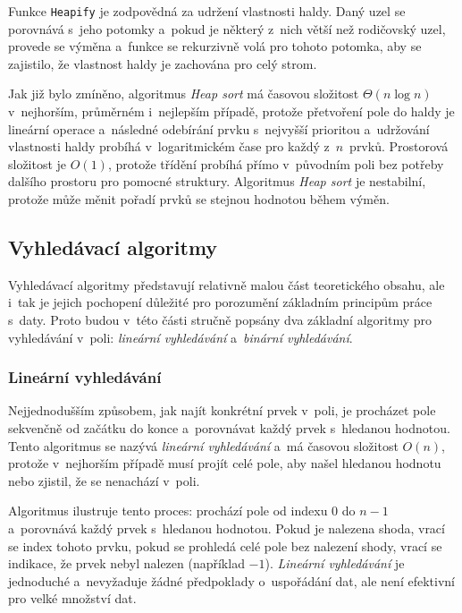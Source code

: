 Funkce \texttt{Heapify} je zodpovědná za udržení vlastnosti haldy.
Daný uzel se porovnává s~jeho potomky a~pokud je některý z~nich větší než rodičovský uzel, provede se výměna a~funkce se rekurzivně volá pro tohoto potomka, aby se zajistilo, že vlastnost haldy je zachována pro celý strom.

Jak již bylo zmíněno, algoritmus \textit{Heap sort} má časovou složitost $\Theta(n \log n)$ v~nejhorším, průměrném i~nejlepším případě, protože přetvoření pole do haldy je lineární operace a~následné odebírání prvku s~nejvyšší prioritou a~udržování vlastnosti haldy probíhá v~logaritmickém čase pro každý z~$n$~prvků.
Prostorová složitost je $O(1)$, protože třídění probíhá přímo v~původním poli bez potřeby dalšího prostoru pro pomocné struktury.
Algoritmus \textit{Heap sort} je nestabilní, protože může měnit pořadí prvků se stejnou hodnotou během výměn.~\cite{levitin}

\subsection{Vyhledávací algoritmy}
\label{subsec:searching_algorithms}

Vyhledávací algoritmy představují relativně malou část teoretického obsahu, ale i~tak je jejich pochopení důležité pro porozumění základním principům práce s~daty.
Proto budou v~této části stručně popsány dva základní algoritmy pro vyhledávání v~poli: \textit{lineární vyhledávání} a~\textit{binární vyhledávání}.

\subsubsection*{Lineární vyhledávání}

Nejjednodušším způsobem, jak najít konkrétní prvek v~poli, je procházet pole sekvenčně od začátku do konce a~porovnávat každý prvek s~hledanou hodnotou.
Tento algoritmus se nazývá \textit{lineární vyhledávání} a~má časovou složitost $O(n)$, protože v~nejhorším případě musí projít celé pole, aby našel hledanou hodnotu nebo zjistil, že se nenachází v~poli.

\begin{listing}[ht]
    
    \caption{Pseudokód lineárního vyhledávání}
    \label{lst:linearSearch}
\end{listing}

Algoritmus  ilustruje tento proces: prochází pole od indexu 0 do $n-1$ a~porovnává každý prvek s~hledanou hodnotou.
Pokud je nalezena shoda, vrací se index tohoto prvku, pokud se prohledá celé pole bez nalezení shody, vrací se indikace, že prvek nebyl nalezen (například $-1$).
\textit{Lineární vyhledávání} je jednoduché a~nevyžaduje žádné předpoklady o~uspořádání dat, ale není efektivní pro velké množství dat.~\cite{sedgewick}

